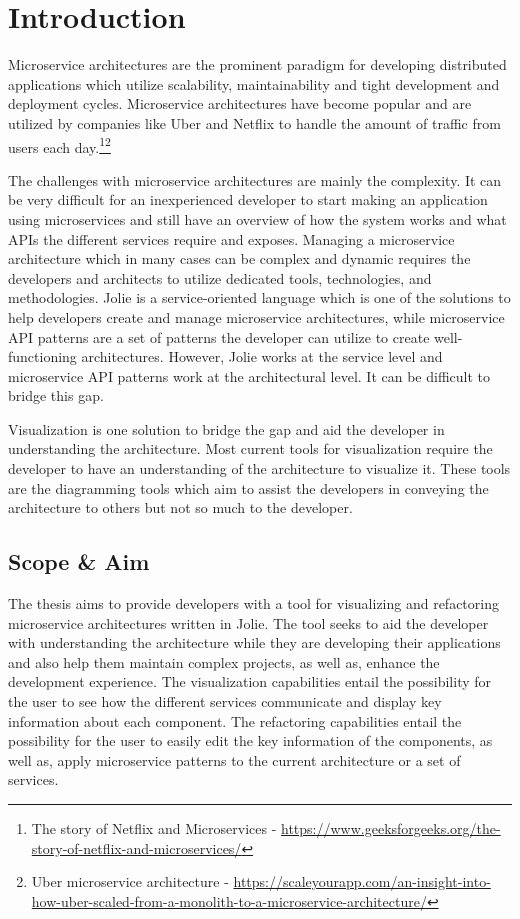 \chapter{Introduction}
Microservice architectures are the prominent paradigm for developing distributed applications which utilize scalability, maintainability and tight development and deployment cycles.
Microservice architectures have become popular and are utilized by companies like Uber and Netflix
to handle the amount of traffic from users each day.\footnote{The story of Netflix and Microservices - \url{https://www.geeksforgeeks.org/the-story-of-netflix-and-microservices/}}\footnote{Uber microservice architecture - \url{https://scaleyourapp.com/an-insight-into-how-uber-scaled-from-a-monolith-to-a-microservice-architecture/}}

The challenges with microservice architectures are mainly the complexity. It can be very difficult for an inexperienced developer to start making an application using microservices and still have an overview of how the system works and what APIs the different services require and exposes.
Managing a microservice architecture which in many cases can be complex and dynamic requires the developers and architects to utilize dedicated tools, technologies, and methodologies.
Jolie\cite{jolie} is a service-oriented language which is one of the solutions to help developers create and manage microservice architectures, while microservice API patterns\cite*{PatternsForAPIDesign:2022} are a set of patterns the developer can utilize to create well-functioning architectures.
However, Jolie works at the service level and microservice API patterns work at the architectural level. It can be difficult to bridge this gap.

Visualization is one solution to bridge the gap and aid the developer in understanding the architecture.
Most current tools for visualization require the developer to have an understanding of the architecture to visualize it.
These tools are the diagramming tools which aim to assist the developers in conveying the architecture to others but not so much to the developer.

\section{Scope \& Aim}
The thesis aims to provide developers with a tool for visualizing and refactoring microservice architectures written in Jolie. The tool seeks to aid the developer with understanding the architecture while they are developing their applications and also 
help them maintain complex projects, as well as, enhance the development experience.
The visualization capabilities entail the possibility for the user to see how the different services communicate and display key information about each component.
The refactoring capabilities entail the possibility for the user to easily edit the key information of the components, as well as, apply microservice patterns to the current architecture or a set of services.


